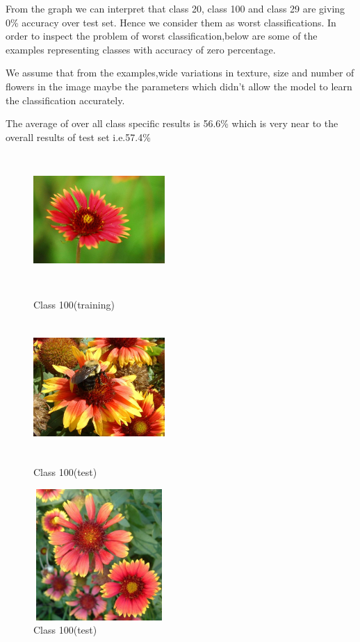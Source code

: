 \documentclass[a4paper,19pt]{article}
\begin{document}
From the graph we can interpret that class 20, class 100 and class 29 are giving 0\% accuracy over test set. Hence we consider them as worst classifications.
In order to inspect the problem of worst classification,below are some of the examples representing classes with accuracy of zero percentage.

We assume that from the examples,wide variations in texture, size and number of flowers in the image maybe the parameters which didn't allow the model to learn the classification accurately.

The average of over all class specific results is 56.6\% which is very near to the overall results of test set i.e.57.4\%




\begin{figure}[!htb]
  \includegraphics[width=5cm, height=5cm]{images/image_07933.jpg}
  \caption{Class 100(training)}\label{fig:awesome_image1}
\endminipage\hfill
{}
  \includegraphics[width=5cm, height=5cm]{images/Class100_1.jpg}
  \caption{Class 100(test)}\label{fig:awesome_image2}
\endminipage\hfill
{}%
  \includegraphics[width=5cm, height=5cm]{images/Class100_2.jpg}
  \caption{Class 100(test)}\label{fig:awesome_image3}
\endminipage
\end{figure}
\end{document}
